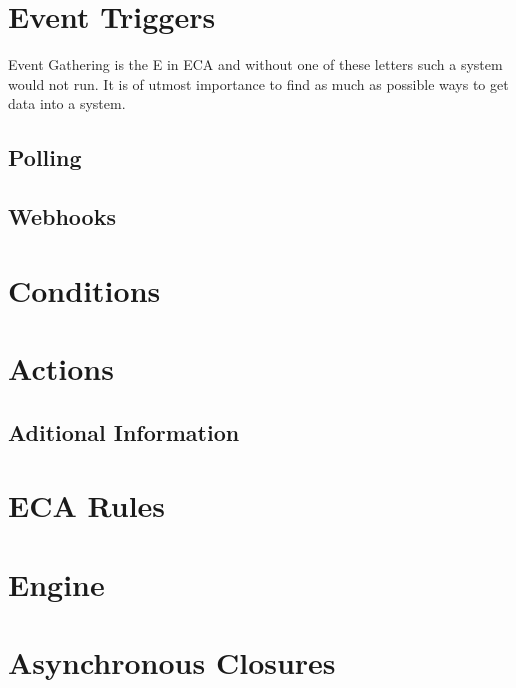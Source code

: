 \section{Event Triggers}

Event Gathering is the E in ECA and without one of these letters such a system would not run.
It is of utmost importance to find as much as possible ways to get data into a system.



\subsection{Polling}



\subsection{Webhooks}




\section{Conditions}




\section{Actions}

\subsection{Aditional Information}

\section{ECA Rules}





\section{Engine}






\section{Asynchronous Closures}
%

